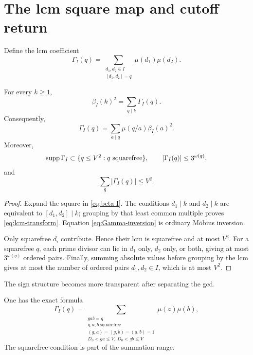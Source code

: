 \section{The lcm square map and cutoff return}
\label{sec:lcm}

Define the lcm coefficient
\begin{equation}
 \Gamma_I(q)=
 \sum_{\substack{d_1,d_2\in I\\{}[d_1,d_2]=q}}
 \mu(d_1)\mu(d_2).
 \label{eq:Gamma-definition}
\end{equation}

\begin{theorem}
\label{thm:lcm-transform}
For every $k\ge1$,
\begin{equation}
 \boxed{\ \beta_I(k)^2=\sum_{q\mid k}\Gamma_I(q).\ }
 \label{eq:lcm-transform}
\end{equation}
Consequently,
\begin{equation}
 \Gamma_I(q)=\sum_{a\mid q}\mu(q/a)\beta_I(a)^2.
 \label{eq:Gamma-inversion}
\end{equation}
Moreover,
\begin{equation}
 \supp\Gamma_I\subset\{q\le V^2:q\ \text{squarefree}\},
 \qquad
 |\Gamma_I(q)|\le3^{\omega(q)},
 \label{eq:Gamma-support-bound}
\end{equation}
and
\begin{equation}
 \sum_q|\Gamma_I(q)|\le V^2.
 \label{eq:Gamma-l1}
\end{equation}
\end{theorem}

\begin{proof}
Expand the square in \eqref{eq:beta-I}.  The conditions
$d_1\mid k$ and $d_2\mid k$ are equivalent to $[d_1,d_2]\mid k$;
grouping by that least common multiple proves \eqref{eq:lcm-transform}.
Equation \eqref{eq:Gamma-inversion} is ordinary M\"obius inversion.

Only squarefree $d_i$ contribute.  Hence their lcm is squarefree and at
most $V^2$.  For a squarefree $q$, each prime divisor can lie in
$d_1$ only, $d_2$ only, or both, giving at most $3^{\omega(q)}$
ordered pairs.  Finally, summing absolute values before grouping by the
lcm gives at most the number of ordered pairs $d_1,d_2\in I$, which is
at most $V^2$.
\end{proof}

The sign structure becomes more transparent after separating the gcd.

\begin{proposition}
\label{prop:gab}
One has the exact formula
\begin{equation}
 \Gamma_I(q)=
 \sum_{\substack{gab=q\\
 g,a,b\ \mathrm{squarefree}\\
 (g,a)=(g,b)=(a,b)=1\\
 D_0<ga\le V,\ D_0<gb\le V}}
 \mu(a)\mu(b),
 \label{eq:Gamma-gab}
\end{equation}
The squarefree condition is part of the summation range.
\end{proposition}

